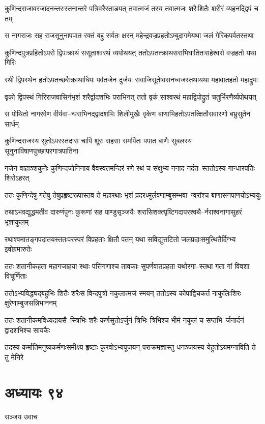 \twolineshloka
{कुणिन्दराजावरजादनन्तरःस्तनान्तरे पत्रिवरैरताडयत्}
{तवात्मजं तस्य तवात्मजः शरैःशितैः शरीरं व्यहनद्द्विपं च तम्}


\twolineshloka
{स नागराजः सह राजसूनुनापपात रक्तं बहु सर्वतः क्षरन्}
{महेन्द्रवज्रप्रहतोऽम्बुदागमेयथा जलं गेरिकपर्वतस्तथा}


\twolineshloka
{कुणिन्दपुत्रप्रहितोऽपरो द्विपःक्राथं ससूताश्वरथं व्यपोथयत्}
{ततोऽपतत्क्राथसराभिघातितःसहेश्वरो वज्रहतो यथा गिरिः}


\twolineshloka
{रथी द्विपस्थेन हतोऽपतच्छरैःक्राथाधिपः पर्वतजेन दुर्जयः}
{सवाजिसूतेष्वसनध्वजस्तथायथा महावातहतो महाद्रुमः}


\twolineshloka
{वृको द्विपस्थं गिरिराजवासिनंभृशं शरैर्द्वादशभिः पराभिनत्}
{ततो वृकं साश्वरथं महाद्विपोद्रुतं चतुर्भिरणैर्व्यपोथयत्}


\twolineshloka
{स पोथितो नागरवेण वीर्यवा--न्पराभिनद्द्वादशभिः शिलीमुखैः}
{वृकेण बाणाभिहतोऽपतत्क्षितौसवारणो बभ्रुसुतेन सार्धम्}


\twolineshloka
{कुणिन्दराजस्य सुतोऽपरस्तदास चापि शूरः सहसा समर्पितः}
{पपात बाणैः सुबलस्य सूनुनाविषाणपुच्छापरगात्रपातिना}


\twolineshloka
{गजेन वाहाञ्शकुनेः कुणिन्दजोनिनाय वैवस्वतमन्दिरं रणे}
{रथं च संक्षुभ्य ननाद नर्दत--स्ततोऽस्य गान्धारपतिः शिरोऽहरत्}


\twolineshloka
{ततः कुणिन्देषु गतेषु तेषुप्रहृष्टरूपास्तव ते महारथाः}
{भृशं प्रदरध्मुर्लवणाम्बुसम्भवा--न्वरांश्च बाणासनपाणयोऽभ्ययुः}


\twolineshloka
{तथाऽभवद्युद्धमतीव दारुणंपुनः कुरूणां सह पाण्डुसृञ्जयैः}
{शरासिशक्त्यृष्टिगदापरश्वथै--र्नराश्वनागासुहरं भृशाकुलम्}


\twolineshloka
{रथाश्वमातङ्गपदातयस्ततःपरस्परं विप्रहताः क्षितौ पतन्}
{यथा सविद्युत्तटितो जलप्रदाःसमुत्थितैर्दिग्भ्य इवोग्रमारुतेः}


\twolineshloka
{ततः शतानीकहता महागजाहया रथाः पत्तिगणाश्च तावकाः}
{सुपर्णवातप्रहता यथोरगा--स्तथा गता गां विवशा विचूर्णिताः}


\twolineshloka
{ततोऽभ्यविद्ध्यद्बहुभिः शितैः शरैःस विन्दपुत्रो नकुलात्मजं स्मयन्}
{ततोऽस्य कोपाद्विचकर्त नाकुलिःशिरः क्षुरेणाम्बुजसन्निभाननम्}


\twolineshloka
{ततः शतानीकमविध्यदायसै--स्त्रिभिः शरैः कर्णसुतोऽर्जुनं त्रिभिः}
{त्रिभिश्च भीमं नकुलं च सप्तभि--र्जनार्दनं द्वादशभिश्च सायकैः}


\twolineshloka
{तदस्य कर्मातिमनुष्यकर्मणःसमीक्ष्य हृष्टाः कुरवोऽभ्यपूजयन्}
{पराक्रमज्ञास्तु धनञ्जयस्य येहुतोऽयमग्नाविति ते तु मेनिरे}


\chapter{अध्यायः ९४}
\twolineshloka
{सञ्जय उवाच}
{}


